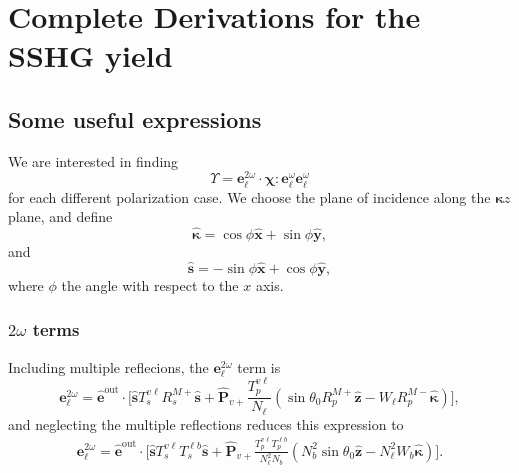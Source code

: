 \chapter{Complete Derivations for the SSHG yield}
\label{app:sshg_explicit_expressions_rif}

\partialtoc


\section{Some useful expressions}
We are interested in finding
\begin{equation*}
\Upsilon = 
\mathbf{e}^{2\omega}_{\ell}\cdot\boldsymbol{\chi}:
\mathbf{e}^{\omega}_{\ell}\mathbf{e}^{\omega}_{\ell}
\end{equation*}
for each different polarization case. We choose the plane of incidence
along the $\boldsymbol{\kappa}z$ plane, and define 
\begin{equation}\label{eqapp:kappavec}
\hat{\boldsymbol{\kappa}}
= \cos\phi\hat{\mathbf{x}} + \sin\phi\hat{\mathbf{y}},
\end{equation}
and
\begin{equation}\label{eqapp:svec}
\hat{\mathbf{s}} = -\sin\phi\hat{\mathbf{x}} + \cos\phi\hat{\mathbf{y}},
\end{equation}
where $\phi$ the angle with respect to the $x$ axis.


\subsection{\texorpdfstring{$2\omega$}{2w} terms}

Including multiple reflecions, the $\mathbf{e}^{2\omega}_{\ell}$ term is
\begin{equation}\label{eqapp:e2wellmr}
\mathbf{e}^{2\omega}_{\ell} = \hat{\mathbf{e}}^{\mathrm{out}}\cdot
\Bigg[
\hat{\mathbf{s}}T_{s}^{v\ell}R^{M+}_{s}\hat{\mathbf{s}} + 
\hat{\mathbf{P}}_{v+}\frac{T^{v\ell}_{p}}{N_{\ell}}
\left(
\sin\theta_{0}R^{M+}_{p}\hat{\mathbf{z}} 
- W_{\ell}R^{M-}_{p}\hat{\boldsymbol{\kappa}}
\right)
\Bigg],
\end{equation}
and neglecting the multiple reflections reduces this expression to
\begin{equation}\label{eqapp:e2well}
\begin{split}
\mathbf{e}^{2\omega}_{\ell} = 
\hat{\mathbf{e}}^{\mathrm{out}}\cdot
\Bigg[
\hat{\mathbf{s}}T_{s}^{v\ell}T_{s}^{\ell b}\hat{\mathbf{s}} + 
\hat{\mathbf{P}}_{v+}
\frac{T^{v\ell}_{p}T^{\ell b}_{p}}
     {N^{2}_{\ell}N_{b}}
\left(
N^{2}_{b}\sin\theta_{0}\hat{\mathbf{z}} - 
N^{2}_{\ell}W_{b}\hat{\boldsymbol{\kappa}}
\right)
\Bigg].
\end{split}
\end{equation}  

